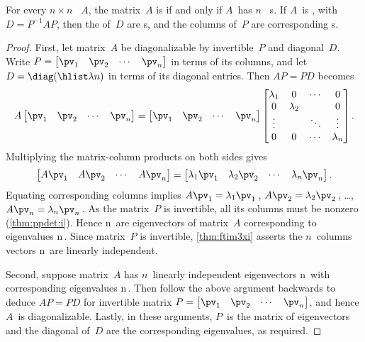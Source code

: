 \begin{theorem} \label{thm:gendiag} 
For every \(n\times n\) ~\(A\), the matrix~\(A\) is  if and only if \(A\)~has \(n\)~ s.  
If \(A\)~is , with  \(D=P^{-1}AP\), then  the  of~\(D\) are s, and the columns of~\(P\) are corresponding s.
\end{theorem}
\begin{proof} 
First, let matrix~\(A\) be diagonalizable by invertible~\(P\) and diagonal~\(D\).
Write \(P=\begin{bmatrix} \pv_1&\pv_2&\cdots&\pv_n \end{bmatrix}\) in terms of its columns, and let \(D=\diag(\hlist\lambda n)\) in terms of its diagonal entries.
Then \(AP=PD\) becomes
\begin{equation*}
A\begin{bmatrix} \pv_1&\pv_2&\cdots&\pv_n \end{bmatrix}
=\begin{bmatrix} \pv_1&\pv_2&\cdots&\pv_n \end{bmatrix}
\begin{bmatrix} \lambda_1&0&\cdots&0\\
0&\lambda_2&&0\\
\vdots&&\ddots&\vdots\\
0&0&\cdots&\lambda_n \end{bmatrix}.
\end{equation*}
Multiplying the matrix-column products on both sides gives
\begin{equation*}
\begin{bmatrix} A\pv_1&A\pv_2&\cdots&A\pv_n \end{bmatrix}
=\begin{bmatrix} \lambda_1\pv_1& \lambda_2\pv_2&\cdots& \lambda_n\pv_n \end{bmatrix}.
\end{equation*}
Equating corresponding columns implies \(A\pv_1=\lambda_1\pv_1\)\,, \(A\pv_2=\lambda_2\pv_2\)\,, \ldots, \(A\pv_n=\lambda_n\pv_n\)\,.
As the matrix~\(P\) is invertible, all its columns must be nonzero (\autoref{thm:ppdet:i}).
Hence \hlist\pv n\ are eigenvectors of matrix~\(A\) corresponding to eigenvalues \hlist\lambda n\,.
Since matrix~\(P\) is invertible, \autoref{thm:ftim3xi} asserts the \(n\)~columns vectors \hlist\pv n\ are linearly independent.

Second, suppose matrix~\(A\) has \(n\)~{linearly independent} {eigenvector}s \hlist\pv n\ with corresponding eigenvalues \hlist\lambda n\,.  
Then follow the above argument backwards to deduce \(AP=PD\) for invertible matrix \(P=\begin{bmatrix} \pv_1&\pv_2&\cdots&\pv_n \end{bmatrix}\), and hence \(A\)~is diagonalizable.
Lastly, in these arguments, \(P\)~is the matrix of eigenvectors and the diagonal of~\(D\) are the corresponding eigenvalues, as required.
\end{proof}


